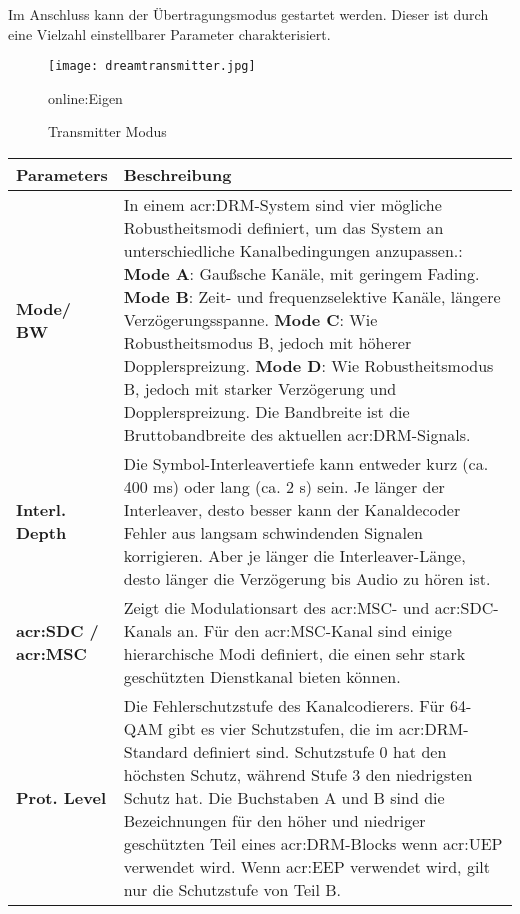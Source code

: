 Im Anschluss kann der Übertragungsmodus gestartet werden. Dieser ist durch eine Vielzahl einstellbarer Parameter charakterisiert. 
\begin{figure}[H]
	\centering
	\texttt{[image: dreamtransmitter.jpg]}
	\caption[Transmitter Modus]{Transmitter Modus} \gls{online:Eigen}
	\label{fig:dreamtransmitter}
\end{figure}
\begin{table}[H]
	\begin{center}
		\begin{tabular}{p{0.17\linewidth}  p{0.83\linewidth}}	
			\toprule
			\textbf{Parameters} &\textbf{Beschreibung}\\
			\midrule
			\textbf{Mode/ BW} & In einem \gls{acr:DRM}-System sind vier mögliche Robustheitsmodi definiert, um das System an unterschiedliche Kanalbedingungen anzupassen.:\newline
			\textbf{Mode A}: Gaußsche Kanäle, mit geringem Fading.\newline
			\textbf{Mode B}: Zeit- und frequenzselektive Kanäle, längere Verzögerungsspanne.\newline
			\textbf{Mode C}: Wie Robustheitsmodus B, jedoch mit höherer Dopplerspreizung.\newline
			\textbf{Mode D}: Wie Robustheitsmodus B, jedoch mit starker Verzögerung und Dopplerspreizung.\newline
			Die Bandbreite ist die Bruttobandbreite des aktuellen \gls{acr:DRM}-Signals. \\

			\textbf{Interl. Depth} & Die Symbol-Interleavertiefe kann entweder kurz (ca. 400 ms) oder lang (ca. 2 s) sein. Je länger der Interleaver, desto besser kann der Kanaldecoder Fehler aus langsam schwindenden Signalen korrigieren. Aber je länger die Interleaver-Länge, desto länger die Verzögerung bis Audio zu hören ist.\\
				
			\textbf{\gls{acr:SDC} / \gls{acr:MSC}} & Zeigt die Modulationsart des \gls{acr:MSC}- und \gls{acr:SDC}-Kanals an. Für den \gls{acr:MSC}-Kanal sind einige hierarchische Modi definiert, die einen sehr stark geschützten Dienstkanal bieten können.\\
		
			\textbf{Prot. Level} & Die Fehlerschutzstufe des Kanalcodierers. Für 64-QAM gibt es vier Schutzstufen, die im \gls{acr:DRM}-Standard definiert sind. Schutzstufe 0 hat den höchsten Schutz, während Stufe 3 den niedrigsten Schutz hat. Die Buchstaben A und B sind die Bezeichnungen für den höher und niedriger geschützten Teil eines \gls{acr:DRM}-Blocks wenn \gls{acr:UEP} verwendet wird. Wenn \gls{acr:EEP} verwendet wird, gilt nur die Schutzstufe von Teil B.\\
		

\end{tabular}
\end{center}
\end{table}
